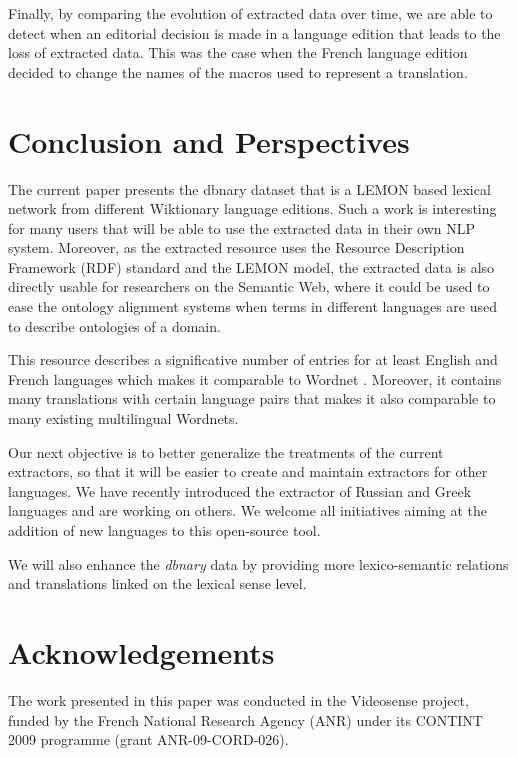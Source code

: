 \documentclass[sw]{iosart2c}
\begin{document}
Finally, by comparing the evolution of extracted data over time, we are able to detect when an editorial decision is made in a language edition that leads to the loss of extracted data. This was the case when the French language edition decided to change the names of the macros used to represent a translation. 

\section{Conclusion and Perspectives}

The current paper presents the dbnary dataset that is a LEMON based lexical network from different Wiktionary language editions. Such a work is interesting for many users that will be able to use the extracted data in their own NLP system. Moreover, as the extracted resource uses the Resource Description Framework (RDF) standard and the LEMON model, the extracted data is also directly usable for researchers on the Semantic Web, where it could be used to ease the ontology alignment systems when terms in different languages are used to describe ontologies of a domain.

This resource describes a significative number of entries for at least English and French languages which makes it comparable to Wordnet \cite{wordnet-fellbaum}. Moreover, it contains many translations with certain language pairs that makes it also comparable to many existing multilingual Wordnets.

Our next objective is to better generalize the treatments of the current extractors, so that it will be easier to create and maintain extractors for other languages. We have recently introduced the extractor of Russian and Greek languages and are working on others. We welcome all initiatives aiming at the addition of new languages to this open-source tool. 

We will also enhance the \textit{dbnary} data by providing more lexico-semantic relations and translations linked on the lexical sense level.

\section{Acknowledgements}

The work presented in this paper was conducted in the Videosense project, funded by the French National Research Agency (ANR) under its CONTINT 2009 programme (grant ANR-09-CORD-026).
\end{document}
